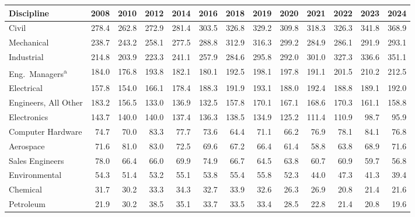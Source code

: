 \begin{table}[htbp]
  \centering
  \small
  \setlength{\tabcolsep}{6pt}
  \label{tab:litReview-employmentActuals}
  \begin{tabular}{@{}lrrrrrrrrrrrr@{}}
    \toprule
    \bfseries Discipline & \bfseries 2008 & \bfseries 2010 & \bfseries 2012 & \bfseries 2014 & \bfseries 2016 & \bfseries 2018 & \bfseries 2019 & \bfseries 2020 & \bfseries 2021 & \bfseries 2022 & \bfseries 2023 & \bfseries 2024 \\
    \midrule
    Civil & 278.4 & 262.8 & 272.9 & 281.4 & 303.5 & 326.8 & 329.2 & 309.8 & 318.3 & 326.3 & 341.8 & 368.9 \\
    Mechanical & 238.7 & 243.2 & 258.1 & 277.5 & 288.8 & 312.9 & 316.3 & 299.2 & 284.9 & 286.1 & 291.9 & 293.1 \\
    Industrial & 214.8 & 203.9 & 223.3 & 241.1 & 257.9 & 284.6 & 295.8 & 292.0 & 301.0 & 327.3 & 336.6 & 351.1 \\
    Eng.\ Managers\textsuperscript{a} & 184.0 & 176.8 & 193.8 & 182.1 & 180.1 & 192.5 & 198.1 & 197.8 & 191.1 & 201.5 & 210.2 & 212.5 \\
    Electrical & 157.8 & 154.0 & 166.1 & 178.4 & 188.3 & 191.9 & 193.1 & 188.0 & 192.4 & 188.8 & 189.1 & 192.0 \\
    Engineers, All Other & 183.2 & 156.5 & 133.0 & 136.9 & 132.5 & 157.8 & 170.1 & 167.1 & 168.6 & 170.3 & 161.1 & 158.8 \\
    Electronics & 143.7 & 140.0 & 140.0 & 137.4 & 136.3 & 138.5 & 134.9 & 125.2 & 111.4 & 110.9 & 98.7 & 95.9 \\
    Computer Hardware & 74.7 & 70.0 & 83.3 & 77.7 & 73.6 & 64.4 & 71.1 & 66.2 & 76.9 & 78.1 & 84.1 & 76.8 \\
    Aerospace & 71.6 & 81.0 & 83.0 & 72.5 & 69.6 & 67.2 & 66.4 & 61.4 & 58.8 & 63.8 & 68.9 & 71.6 \\
    Sales Engineers & 78.0 & 66.4 & 66.0 & 69.9 & 74.9 & 66.7 & 64.5 & 63.8 & 60.7 & 60.9 & 59.7 & 56.8 \\
    Environmental & 54.3 & 51.4 & 53.2 & 55.1 & 53.8 & 55.4 & 55.8 & 52.3 & 44.0 & 47.3 & 41.3 & 39.4 \\
    Chemical & 31.7 & 30.2 & 33.3 & 34.3 & 32.7 & 33.9 & 32.6 & 26.3 & 26.9 & 20.8 & 21.4 & 21.6 \\
    Petroleum & 21.9 & 30.2 & 38.5 & 35.1 & 33.7 & 33.5 & 33.4 & 28.5 & 22.8 & 21.4 & 20.8 & 19.6 \\

\end{tabular}
\end{table}
